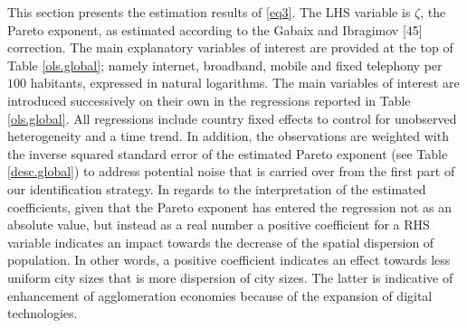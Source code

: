 \documentclass[10pt,letterpaper]{article}
\begin{document}
This section presents the estimation results of \ref{eq3}. The LHS
variable is \(\zeta\), the \color{blue} Pareto exponent, \color{black}
as estimated according to the Gabaix and Ibragimov {[}45{]} correction.
The main explanatory variables of interest are provided at the top of
Table \ref{ols.global}; namely internet, broadband, mobile and fixed
telephony per \(100\) habitants, expressed in natural logarithms. The
main variables of interest are introduced successively on their own in
the regressions reported in Table \ref{ols.global}. All regressions
include country fixed effects to control for unobserved heterogeneity
and a time trend. In addition, the observations are weighted with the
inverse squared standard error of the estimated \color{blue} Pareto
exponent \color{black} (see Table \ref{desc.global}) to address
potential noise that is carried over from the first part of our
identification strategy. In regards to the interpretation of the
estimated coefficients, given that the \color{blue} Pareto exponent
\color{black} has entered the regression not as an absolute value, but
instead as a real number a positive coefficient for a RHS variable
indicates an impact towards the decrease of the spatial dispersion of
population. In other words, a positive coefficient indicates an effect
towards less uniform city sizes that is more dispersion of city sizes.
The latter is indicative of enhancement of agglomeration economies
because of the expansion of digital technologies.
\end{document}
